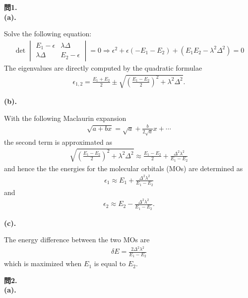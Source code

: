 \documentclass{jlreq}
\begin{document}
\noindent
\textbf{問1.}\\


\noindent
\textbf{(a).}

Solve the following equation:
\begin{eqnarray}
    \det
    \begin{vmatrix}
        E_1-\epsilon & \lambda\Delta \\
        \lambda\Delta & E_2-\epsilon 
    \end{vmatrix}=0\Rightarrow \epsilon^2+\epsilon(-E_1-E_2)+(E_1E_2-\lambda^2\Delta^2)=0   
\end{eqnarray}  
The eigenvalues are directly computed by the quadratic formulae
\begin{eqnarray}
    \epsilon_{1,2}=\frac{E_1+E_2}{2}\pm\sqrt{\left(\frac{E_1-E_2}{2}\right)^2+\lambda^2\Delta^2}.
\end{eqnarray}  

\noindent
\textbf{(b).}

With the following Maclaurin expansion
\begin{eqnarray}
    \sqrt{a+bx}=\sqrt{a}+\frac{b}{2\sqrt{a}}x+\cdots
\end{eqnarray}  
the second term is approximated as
\begin{eqnarray}
    \sqrt{\left(\frac{E_1-E_2}{2}\right)^2+\lambda^2\Delta^2}\approx\frac{E_1-E_2}{2}+\frac{\Delta^2\lambda^2}{E_1-E_2}
\end{eqnarray}
and hence the the energies for the molecular orbitals (MOs) are determined as
\begin{eqnarray}
    \epsilon_1\approx E_1+\frac{\Delta^2\lambda^2}{E_1-E_2}
\end{eqnarray}
and
\begin{eqnarray}
    \epsilon_2\approx E_2-\frac{\Delta^2\lambda^2}{E_1-E_2}.
\end{eqnarray}

\noindent
\textbf{(c).}

The energy difference between the two MOs are
\begin{eqnarray}
\delta E=\frac{2\Delta^2\lambda^2}{E_1-E_2}
\end{eqnarray}
which is maximized when $E_1$ is equal to $E_2$.

\clearpage

\noindent
\textbf{問2.}\\

\noindent
\textbf{(a).} 
\end{document}

